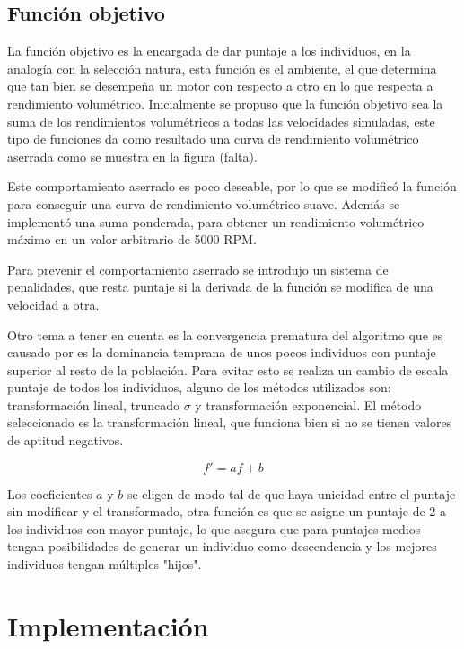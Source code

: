 \subsection{Función objetivo}
%
La función objetivo es la encargada de dar puntaje a los individuos, en la
analogía con la selección natura, esta función es el ambiente, el que determina
que tan bien se desempeña un motor con respecto a otro en lo que respecta a
rendimiento volumétrico.
%
Inicialmente se propuso que la función objetivo sea la suma de los rendimientos
volumétricos a todas las velocidades simuladas, este tipo de funciones da como
resultado una curva de rendimiento volumétrico aserrada como se muestra en la
figura (falta).

Este comportamiento aserrado es poco deseable, por lo que se modificó la
función para conseguir una curva de rendimiento volumétrico suave.
%
Además se implementó una suma ponderada, para obtener un rendimiento
volumétrico máximo en un valor arbitrario de 5000 RPM.

Para prevenir el comportamiento aserrado se introdujo un sistema de
penalidades, que resta puntaje si la derivada de la función se modifica de una
velocidad a otra.


Otro tema a tener en cuenta es la convergencia prematura del algoritmo que es
causado por es la dominancia temprana de unos pocos individuos con puntaje
superior al resto de la población.
%
Para evitar esto se realiza un cambio de escala puntaje de todos los
individuos, alguno de los métodos utilizados son: transformación lineal,
truncado $\sigma$ y transformación exponencial.
%
El método seleccionado es la transformación lineal, que funciona bien
\cite{goldberg} si no se tienen valores de aptitud negativos.

\begin{equation}
    f' = af + b
\end{equation}

Los coeficientes $a$ y $b$ se eligen de modo tal de que haya unicidad entre el
puntaje sin modificar y el transformado, otra función es que se asigne un
puntaje de 2 a los individuos con mayor puntaje, lo que asegura que para
puntajes medios tengan posibilidades de generar un individuo como descendencia y
los mejores individuos tengan múltiples "hijos".

\section{Implementación}


